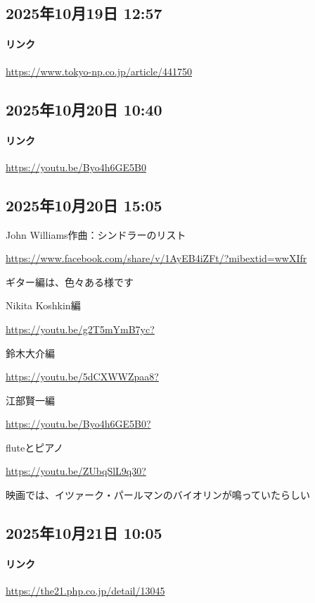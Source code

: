 \subsection*{2025年10月19日 12:57}

\paragraph{リンク}
\url{https://www.tokyo-np.co.jp/article/441750}

\subsection*{2025年10月20日 10:40}

\paragraph{リンク}
\url{https://youtu.be/Byo4h6GE5B0}

\subsection*{2025年10月20日 15:05}

John Williams作曲：シンドラーのリスト

\url{https://www.facebook.com/share/v/1AyEB4iZFt/?mibextid=wwXIfr}

ギター編は、色々ある様です

Nikita Koshkin編

\url{https://youtu.be/g2T5mYmB7yc?}

鈴木大介編

\url{https://youtu.be/5dCXWWZpaa8?}

江部賢一編

\url{https://youtu.be/Byo4h6GE5B0?}

fluteとピアノ

\url{https://youtu.be/ZUbqSlL9q30?}

映画では、イツァーク・パールマンのバイオリンが鳴っていたらしい

\subsection*{2025年10月21日 10:05}

\paragraph{リンク}
\url{https://the21.php.co.jp/detail/13045}

